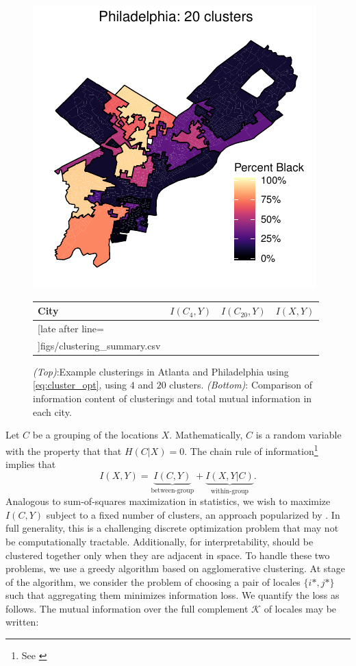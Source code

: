 \documentclass[9pt,twocolumn,twoside]{pnas-new}
\begin{document}
\begin{figure}
		\includegraphics[width = .5\linewidth]{figs/Philadelphia_clusters_binary_20.pdf} \\
		
		\centering
		\begin{tabular}{l | c c c}
			\bfseries City  & $I(C_4, Y)$ & $I(C_{20},Y)$ & $I(X,Y)$ \\\hline
			\csvreader[late after line=\\]{figs/clustering_summary.csv}{}
			{\csvcoli & \csvcoliii & \csvcoliv & \csvcolii}
		\end{tabular}
		\caption{
			\emph{(Top)}:Example clusterings in Atlanta and Philadelphia using \eqref{eq:cluster_opt}, using $4$ and $20$ clusters. 
			\emph{(Bottom)}: Comparison of information content of clusterings and total mutual information in each city. 
		} \label{fig:clusterings}
	\end{figure}
	Let $C$ be a grouping of the locations $X$. Mathematically, $C$ is a random variable with the property that that $H(C|X) = 0$. The chain rule of information\footnote{See \cite{Cover1991}} implies that 
	\begin{equation}
		I(X,Y) = \underbrace{I(C,Y)}_{\text{between-group}} + \underbrace{I(X,Y|C)}_{\text{within-group}}. \label{eq:chain_rule}
	\end{equation}
	Analogous to sum-of-squares maximization in statistics, we wish to maximize $I(C,Y)$ subject to a fixed number of clusters, an approach popularized by \cite{Dhillon2003,Banerjee2005}. In full generality, this is a challenging discrete optimization problem that may not be computationally tractable. Additionally, for interpretability, should be clustered together only when they are adjacent in space. To handle these two problems, we use a greedy algorithm based on agglomerative clustering. At stage of the algorithm, we consider the problem of choosing a pair of locales $\{i*, j*\}$ such that aggregating them minimizes information loss. We quantify the loss as follows. The mutual information over the full complement $\mathcal{K}$ of locales may be written: 
\end{document}
